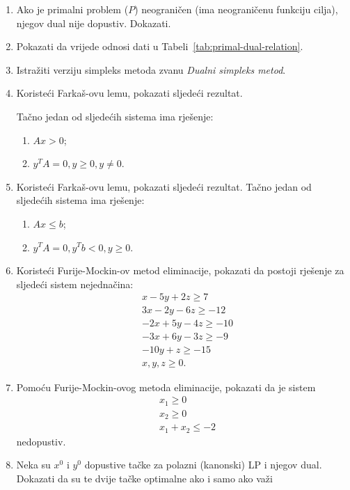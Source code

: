 \documentclass[b5paper, utf8, 11pt, colorlinks]{book}
\theoremstyle{definition}
\begin{document}
\begin{enumerate}
	\item Ako je primalni problem ($P$) neograničen (ima neograničenu funkciju cilja), njegov dual nije dopustiv. Dokazati.
	\item Pokazati da vrijede odnosi dati u Tabeli~\ref{tab:primal-dual-relation}.
	\item Istražiti verziju simpleks metoda zvanu \emph{Dualni simpleks metod}.
	\item Koristeći Farkaš-ovu lemu, pokazati sljedeći rezultat. 
	
	Tačno jedan od sljedećih sistema ima rješenje:%
	\begin{enumerate}
		\item $Ax > 0$; 
		\item $y^T A = 0, y \geq 0, y \neq 0.$
	\end{enumerate}
	\item Koristeći Farkaš-ovu lemu, pokazati sljedeći rezultat. 	Tačno jedan od sljedećih sistema ima rješenje:%
	\begin{enumerate}
		\item $Ax \leq b$; 
		\item $y^T A = 0, y^T b < 0, y \geq 0.$
	\end{enumerate}
	\item  %
	Koristeći Furije-Mockin-ov metod eliminacije, pokazati da postoji rješenje za sljedeći sistem nejednačina:
	\begin{align*} 
		&x - 5y + 2 z \geq 7 \\
		&3x - 2y - 6 z \geq -12 \\
		& -2x + 5y - 4z \geq -10 \\
		& -3x + 6y - 3z \geq -9 \\
		& -10 y + z \geq -15 \\  
		& x,y,z \geq 0.
	\end{align*}
	\item Pomoću Furije-Mockin-ovog metoda eliminacije, pokazati da je sistem 
	\begin{align*}
		&x_1 \geq 0 \\
		&x_2 \geq 0 \\
		& x_1 + x_2 \leq -2 
	\end{align*}
	nedopustiv.%
	
	\item Neka su $x^0$ i $y^0$ dopustive tačke za polazni (kanonski) LP i njegov dual. Dokazati da su te dvije tačke optimalne ako i samo ako važi 
	

\end{enumerate}
\end{document}

